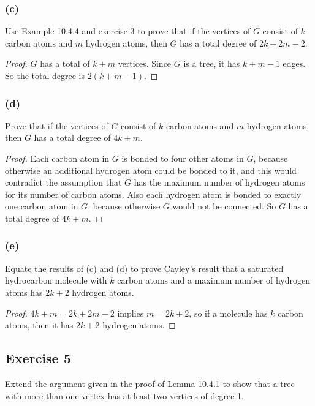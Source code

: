 \documentclass[14pt]{extarticle}
\begin{document}
\subsubsection{(c)}
Use Example 10.4.4 and exercise 3 to prove that if the vertices of \(G\) consist of \(k\) carbon atoms and \(m\)
hydrogen atoms, then \(G\) has a total degree of \(2k + 2m - 2\).

\begin{proof}
    \(G\) has a total of \(k+m\) vertices. Since \(G\) is a tree, it has \(k+m-1\) edges. So the total degree is \(2(k+m-1)\).
\end{proof}

\subsubsection{(d)}
Prove that if the vertices of \(G\) consist of \(k\) carbon atoms and \(m\) hydrogen atoms, then \(G\) has a total degree
of \(4k + m\).

\begin{proof}
    Each carbon atom in \(G\) is bonded to four other atoms in \(G\), because otherwise an additional hydrogen atom could be
    bonded to it, and this would contradict the assumption that \(G\) has the maximum number of hydrogen atoms for its number
    of carbon atoms. Also each hydrogen atom is bonded to exactly one carbon atom in \(G\), because otherwise \(G\) would not be
    connected. So \(G\) has a total degree of \(4k+m\).
\end{proof}

\subsubsection{(e)}
Equate the results of (c) and (d) to prove Cayley’s result that a saturated hydrocarbon molecule with \(k\) carbon atoms
and a maximum number of hydrogen atoms has \(2k + 2\) hydrogen atoms.

\begin{proof}
    \(4k+m = 2k+2m-2\) implies \(m = 2k+2\), so if a molecule has \(k\) carbon atoms, then it has \(2k+2\) hydrogen atoms.
\end{proof}

\subsection{Exercise 5}
Extend the argument given in the proof of Lemma 10.4.1 to show that a tree with more than one vertex has at least two
vertices of degree 1.
\end{document}
